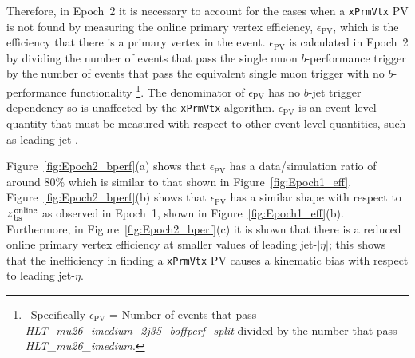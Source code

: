 Therefore, in Epoch~2 it is necessary to account for the cases when a \verb|xPrmVtx| PV is not found
by measuring the online primary vertex efficiency, $\epsilon_{\text{PV}}$,
which is the efficiency that there is a primary vertex in the event.
$\epsilon_{\text{PV}}$ is calculated in Epoch~2 by dividing the number of events that pass the single muon $b$-performance trigger
by the number of events that pass the equivalent single muon trigger with no $b$-performance functionality
\footnote{\ Specifically $\epsilon_{\text{PV}}$ = Number of events that pass \textit{HLT\_mu26\_imedium\_2j35\_boffperf\_split} divided by the number that pass \textit{HLT\_mu26\_imedium}.}.
The denominator of $\epsilon_{\text{PV}}$ has no $b$-jet trigger dependency so is unaffected by the \verb|xPrmVtx| algorithm.
$\epsilon_{\text{PV}}$ is an event level quantity that must be measured with respect to other event level quantities, such as leading jet-\pT.

Figure~\ref{fig:Epoch2_bperf}(a) shows that $\epsilon_{\text{PV}}$ has a data/simulation ratio of around 80\%  which is similar to that shown in Figure~\ref{fig:Epoch1_eff}.
Figure~\ref{fig:Epoch2_bperf}(b) shows that $\epsilon_{\text{PV}}$ has a similar shape with respect to  $z_{\,\text{bs}}^{\text{\,online}}$ as observed in Epoch~1,
shown in Figure~\ref{fig:Epoch1_eff}(b).
Furthermore, in Figure~\ref{fig:Epoch2_bperf}(c) it is shown that there is a reduced online primary vertex efficiency at smaller values of leading jet-$|\eta|$;
this shows that the inefficiency in finding a \verb|xPrmVtx| PV causes a kinematic bias with respect to leading jet-$\eta$. %

